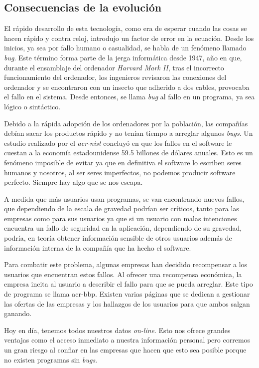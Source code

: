\documentclass[twoside, titlepage, 12pt, a4paper]{article}
\begin{document}
\subsection{Consecuencias de la evolución}
El rápido desarrollo de esta tecnología, como era de esperar cuando las cosas se hacen rápido y contra reloj, introdujo un factor de error en la ecuación. Desde los inicios, ya sea por fallo humano o casualidad, se habla de un fenómeno llamado \textit{\gls{bug}}. Este término forma parte de la jerga informática desde 1947, año en que, durante el ensamblaje del ordenador \textit{Harvard Mark II}, tras el incorrecto funcionamiento del ordenador, los ingenieros revisaron las conexiones del ordenador y se encontraron con un insecto que adherido a dos cables, provocaba el fallo en el sistema. Desde entonces, se llama \textit{\gls{bug}} al fallo en un programa, ya sea lógico o sintáctico.\par
Debido a la rápida adopción de los ordenadores por la población, las compañías debían sacar los productos rápido y no tenían tiempo a arreglar algunos \textit{\gls{bug}s}. Un estudio realizado por el \textit{\gls{acr-nist}} concluyó en que los fallos en el software le cuestan a la economía estadounidense 59.5 billones de dólares anuales.\cite{NIST} Esto es un fenómeno imposible de evitar ya que en definitiva el software lo escriben seres humanos y nosotros, al ser seres imperfectos, no podemos producir software perfecto. Siempre hay algo que se nos escapa.\par
A medida que más usuarios usan programas, se van encontrando nuevos fallos, que dependiendo de la escala de gravedad podrían ser críticos, tanto para las empresas como para sus usuarios ya que si un usuario con malas intenciones encuentra un fallo de seguridad en la aplicación, dependiendo de su gravedad, podría, en teoría obtener información sensible de otros usuarios además de información interna de la compañía que ha hecho el software.\par
Para combatir este problema, algunas empresas han decidido recompensar a los usuarios que encuentran estos fallos. Al ofrecer una recompensa económica, la empresa incita al usuario a describir el fallo para que se pueda arreglar. Este tipo de programa se llama \gls{acr-bbp}. Existen varias páginas que se dedican a gestionar las ofertas de las empresas y los hallazgos de los usuarios para que ambos salgan ganando.\par
Hoy en día, tenemos todos nuestros datos \textit{on-line}. Esto nos ofrece grandes ventajas como el acceso inmediato a nuestra información personal pero corremos un gran riesgo al confiar en las empresas que hacen que esto sea posible porque no existen programas sin  \textit{\gls{bug}s}.
\end{document}
